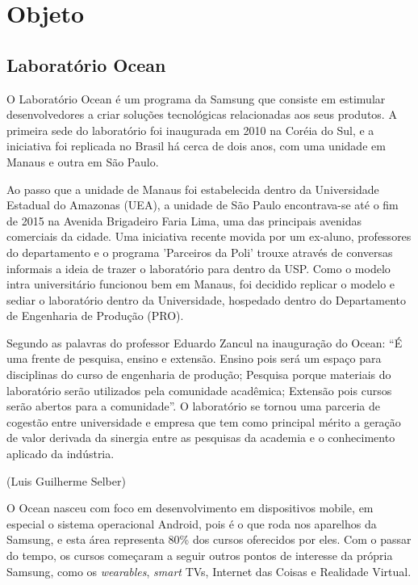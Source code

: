 \chapter{Objeto}

\section{Laboratório Ocean}

O Laboratório Ocean é um programa da Samsung que consiste em estimular desenvolvedores a criar soluções tecnológicas relacionadas aos seus produtos. A primeira sede do laboratório foi inaugurada em 2010 na Coréia do Sul, e a iniciativa foi replicada no Brasil há cerca de dois anos, com uma unidade em Manaus e outra em São Paulo.

Ao passo que a unidade de Manaus foi estabelecida dentro da Universidade Estadual do Amazonas (UEA), a unidade de São Paulo encontrava-se até o fim de 2015 na Avenida Brigadeiro Faria Lima, uma das principais avenidas comerciais da cidade. Uma iniciativa recente movida por um ex-aluno, professores do departamento e o programa 'Parceiros da Poli' trouxe através de conversas informais a ideia de trazer o laboratório para dentro da USP. Como o modelo intra universitário funcionou bem em Manaus, foi decidido replicar o modelo e sediar o laboratório dentro da Universidade, hospedado dentro do Departamento de Engenharia de Produção (PRO).

Segundo as palavras do professor Eduardo Zancul na inauguração do Ocean: “É uma frente de pesquisa, ensino e extensão. Ensino pois será um espaço para disciplinas do curso de engenharia de produção; Pesquisa porque materiais do laboratório serão utilizados pela comunidade acadêmica; Extensão pois cursos serão abertos para a comunidade”. O laboratório se tornou uma parceria de cogestão entre universidade e empresa que tem como principal mérito a geração de valor derivada da sinergia entre as pesquisas da academia e o conhecimento aplicado da indústria. 

(Luis Guilherme Selber)

O Ocean nasceu com foco em desenvolvimento em dispositivos mobile, em especial o sistema operacional Android, pois é o que roda nos aparelhos da Samsung, e esta área representa 80\% dos cursos oferecidos por eles. Com o passar do tempo, os cursos começaram a seguir outros pontos de interesse da própria Samsung, como os \textit{wearables}, \textit{smart} TVs, Internet das Coisas e Realidade Virtual. 

